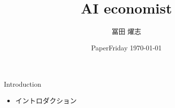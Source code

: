 \documentclass[unicode,aspectratio=169,11pt]{beamer}
\title{AI economist}
\author{冨田 燿志}
\date{PaperFriday \today}
\begin{document}
\maketitle

\begin{frame}{Introduction}
    \begin{itemize}
        \item イントロダクション
    \end{itemize}
\end{frame}
\end{document}
